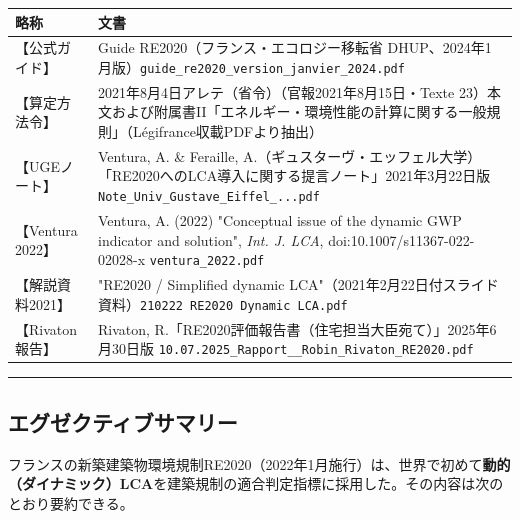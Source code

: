 \documentclass[11pt]{ltjsarticle}
\begin{document}
\begin{longtable}[]{@{}ll@{}}
\toprule
略称 & 文書\tabularnewline
\midrule
\endhead
【公式ガイド】 & Guide RE2020（フランス・エコロジー移転省
DHUP、2024年1月版）\texttt{guide\_re2020\_version\_janvier\_2024.pdf}\tabularnewline
【算定方法令】 & 2021年8月4日アレテ（省令）（官報2021年8月15日・Texte
23）本文および附属書II「エネルギー・環境性能の計算に関する一般規則」（Légifrance収載PDFより抽出）\tabularnewline
【UGEノート】 & Ventura, A. \& Feraille,
A.（ギュスターヴ・エッフェル大学）「RE2020へのLCA導入に関する提言ノート」2021年3月22日版
\texttt{Note\_Univ\_Gustave\_Eiffel\_...pdf}\tabularnewline
【Ventura 2022】 & Ventura, A. (2022) "Conceptual issue of the dynamic
GWP indicator and solution", \emph{Int. J. LCA},
doi:10.1007/s11367-022-02028-x \texttt{ventura\_2022.pdf}\tabularnewline
【解説資料2021】 & "RE2020 / Simplified dynamic
LCA"（2021年2月22日付スライド資料）\texttt{210222\ RE2020\ Dynamic\ LCA.pdf}\tabularnewline
【Rivaton報告】 & Rivaton,
R.「RE2020評価報告書（住宅担当大臣宛て）」2025年6月30日版
\texttt{10.07.2025\_Rapport\_\_Robin\_Rivaton\_RE2020.pdf}\tabularnewline
\bottomrule
\end{longtable}

\begin{center}\rule{0.5\linewidth}{0.5pt}\end{center}

\hypertarget{ux30a8ux30b0ux30bcux30afux30c6ux30a3ux30d6ux30b5ux30deux30eaux30fc}{%
\subsection{エグゼクティブサマリー}\label{ux30a8ux30b0ux30bcux30afux30c6ux30a3ux30d6ux30b5ux30deux30eaux30fc}}

フランスの新築建築物環境規制RE2020（2022年1月施行）は、世界で初めて\textbf{動的（ダイナミック）LCA}を建築規制の適合判定指標に採用した。その内容は次のとおり要約できる。
\end{document}
